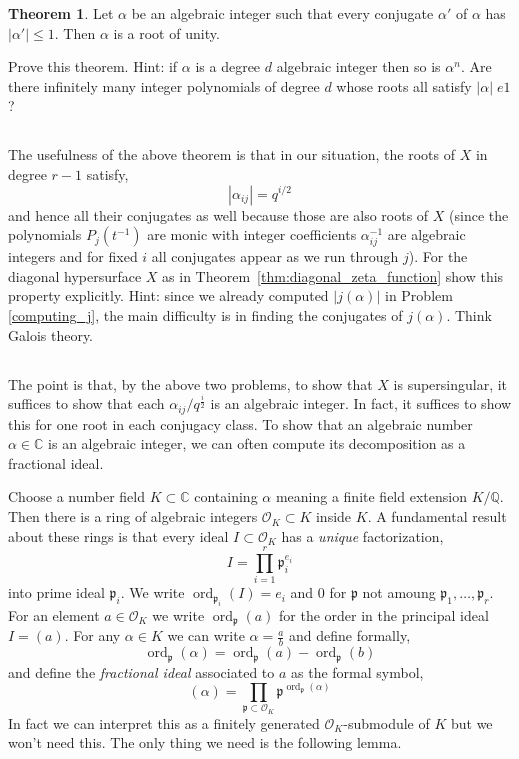 \documentclass[12pt]{article}
\DeclareMathOperator{\ord}{\mathrm{ord}}
\newcommand{\Q}{\mathbb{Q}}
\newcommand{\CC}{\mathbb{C}}
\theoremstyle{remark}
\theoremstyle{definition}
\newtheorem{theorem}{Theorem}[subsection]
\begin{document}
\begin{theorem}
Let $\alpha$ be an algebraic integer such that every conjugate $\alpha'$ of $\alpha$ has $|\alpha'| \le 1$. Then $\alpha$ is a root of unity.
\end{theorem}

Prove this theorem. Hint: if $\alpha$ is a degree $d$ algebraic integer then so is $\alpha^n$. Are there infinitely many integer polynomials of degree $d$ whose roots all satisfy $|\alpha| \;e 1$?

\subsection{}

The usefulness of the above theorem is that in our situation, the roots of $X$ in degree $r-1$ satisfy,
\[ |\alpha_{ij}| = q^{i/2} \]
and hence all their conjugates as well because those are also roots of $X$ (since the polynomials $P_j(t^{-1})$ are monic with integer coefficients $\alpha_{ij}^{-1}$ are algebraic integers and for fixed $i$ all conjugates appear as we run through $j$). For the diagonal hypersurface $X$ as in Theorem~\ref{thm:diagonal_zeta_function} show this property explicitly. Hint: since we already computed $|j(\alpha)|$ in Problem \ref{computing_j}, the main difficulty is in finding the conjugates of $j(\alpha)$. Think Galois theory. 

\subsection{}

\newcommand{\iO}{\mathcal{O}}
\newcommand{\p}{\mathfrak{p}}

The point is that, by the above two problems, to show that $X$ is supersingular, it suffices to show that each $\alpha_{ij} / q^{\frac{i}{2}}$ is an algebraic integer. In fact, it suffices to show this for one root in each conjugacy class. To show that an algebraic number $\alpha \in \CC$ is an algebraic integer, we can often compute its decomposition as a fractional ideal. 
\par
Choose a number field $K \subset \CC$ containing $\alpha$ meaning a finite field extension $K / \Q$. Then there is a ring of algebraic integers $\iO_{K} \subset K$ inside $K$. A fundamental result about these rings is that every ideal $I \subset \iO_{K}$ has a \textit{unique} factorization,
\[ I = \prod_{i = 1}^r \p_i^{e_i} \]
into prime ideal $\p_i$. We write $\ord_{\p_i}(I) = e_i$ and $0$ for $\p$ not amoung $\p_1, \dots, \p_r$. For an element $a \in \iO_{K}$ we write $\ord_{\p}(a)$ for the order in the principal ideal $I = (a)$. For any $\alpha \in K$ we can write $\alpha = \frac{a}{b}$ and define formally,
\[ \ord_{\p}(\alpha) = \ord_{\p}(a) - \ord_{\p}(b) \]
and define the \textit{fractional ideal} associated to $a$ as the formal symbol,
\[ (\alpha) = \prod_{\p \subset \iO_{K}} \p^{\ord_{\p}(\alpha)} \]
In fact we can interpret this as a finitely generated $\iO_{K}$-submodule of $K$ but we won't need this. The only thing we need is the following lemma.
\end{document}
